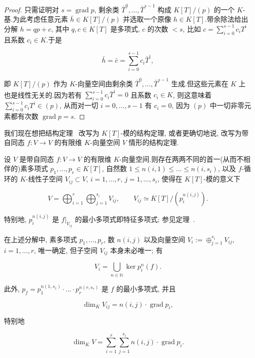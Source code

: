 \begin{proof}
只需证明对 $s = \operatorname{grad} p$, 剩余类 $\bar{T}^0, \ldots, \bar{T}^{s - 1}$ 构成 $K[T]/(p)$ 的一个 $K$-基.为此考虑任意元素 $\bar{h} \in K[T]/(p)$ 并选取一个原像 $h \in K[T]$.带余除法给出分解 $h = qp + c$, 其中 $q, c \in K[T]$ 是多项式, $c$ 的次数 $< s$, 比如 $c = \sum_{i = 0}^{s - 1} c_i T^i$ 且系数 $c_i \in K$.于是

\[
\bar{h} = \bar{c} = \sum_{i = 0}^{s - 1} c_i \bar{T}^i,\]

即 $K[T]/(p)$ 作为 $K$-向量空间由剩余类 $\bar{T}^0, \ldots, \bar{T}^{s - 1}$ 生成.但这些元素在 $K$ 上也是线性无关的.因为若有 $\sum_{i = 0}^{s - 1} c_i \bar{T}^i = 0$ 且系数 $c_i \in K$, 则这意味着 $\sum_{i = 0}^{s - 1} c_i T^i \in (p)$, 从而对一切 $i = 0, \ldots, s - 1$ 有 $c_i = 0$, 因为 $(p)$ 中一切非零元素都有次数 $\operatorname{grad} p = s$.
\end{proof}

我们现在想把结构定理~ 改写为 $K[T]$-模的结构定理, 或者更确切地说, 改写为带自同态 $f \colon V \longrightarrow V$ 的有限维 $K$-向量空间 $V$ 情形的结构定理.

\begin{bigtheorem}\label{bigthm:6.5.6}
设 $V$ 是带自同态 $f \colon V \longrightarrow V$ 的有限维 $K$-向量空间.则存在两两不同的首一(从而不相伴的)素多项式 $p_1, \ldots, p_r \in K[T]$, 自然数 $1 \leq n(i, 1) \leq \ldots \leq n(i, s_i)$, 以及 $f$-循环的 $K$-线性子空间 $V_{ij} \subset V$, $i = 1, \ldots, r$, $j = 1, \ldots, s_i$, 使得在 $K[T]$-模的意义下

\[
V = \bigoplus_{i = 1}^{r} \bigoplus_{j = 1}^{s_i} V_{ij}, \qquad V_{ij} \simeq K[T]/(p_i^{n(i, j)})\text{.}\]

特别地, $p_i^{n(i, j)}$ 是 $f|_{V_{ij}}$ 的最小多项式即特征多项式; 参见定理~.

在上述分解中, 素多项式 $p_1, \ldots, p_r$, 数 $n(i, j)$ 以及向量空间 $V_i := \oplus_{j = 1}^{s_i} V_{ij}$, $i = 1, \ldots, r$, 唯一确定, 但子空间 $V_{ij}$ 本身未必唯一; 有

\[
V_i = \bigcup_{n \in \mathbb{N}} \ker p_i^n(f)\text{.}\]

此外, $p_f = p_1^{n(1, s_1)} \cdot \ldots \cdot p_r^{n(r, s_r)}$ 是 $f$ 的最小多项式, 并且

\[
\dim_K V_{ij} = n(i, j) \cdot \operatorname{grad} p_i,\]

特别地

\[
\dim_K V = \sum_{i = 1}^{r} \sum_{j = 1}^{s_i} n(i, j) \cdot \operatorname{grad} p_i\text{.}\]
\end{bigtheorem}

